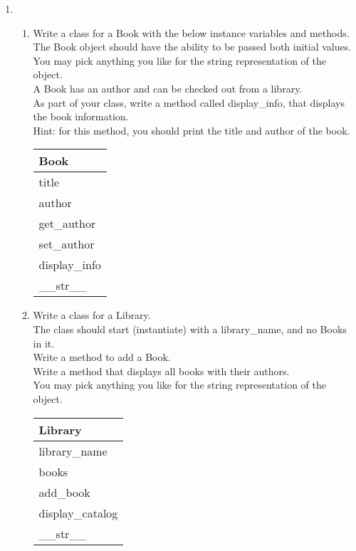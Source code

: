 \documentclass{article}
\begin{document}
\begin{enumerate}
	\item
	\begin{enumerate}
		\item
			Write a class for a Book with the below instance variables and methods.\\ 
			The Book object should have the ability to be passed both initial values.\\  
			You may pick anything you like for the string representation of the object.\\
			A Book has an author and can be checked out from a library.\\  
			As part of your class, write a method called display\_info, that displays the book information.\\
			Hint: for this method, you should print the title and author of the book.
			\begin{flushright}
			\begin{tabular}{|l|}
				\hline
				Book\\ \hline
				title \\	author\\	 \hline
				get\_author \\ set\_author \\ display\_info \\ \_\_str\_\_ \\ \hline
			\end{tabular}
			\end{flushright}

		\item
			Write a class for a Library. \\
			The class should start (instantiate) with a library\_name, and no Books in it. \\ 
			Write a method to add a Book.\\
			Write a method that displays all books with their authors.\\
			You may pick anything you like for the string representation of the object.
	
			\begin{flushright}
			\begin{tabular}{|l|}
				\hline
				Library\\ \hline  	%
				library\_name \\ books\\ \hline		%
				add\_book \\ display\_catalog \\ \_\_str\_\_ \\ \hline		%
			\end{tabular}
			\end{flushright}


\end{enumerate}
\end{enumerate}
\end{document}
